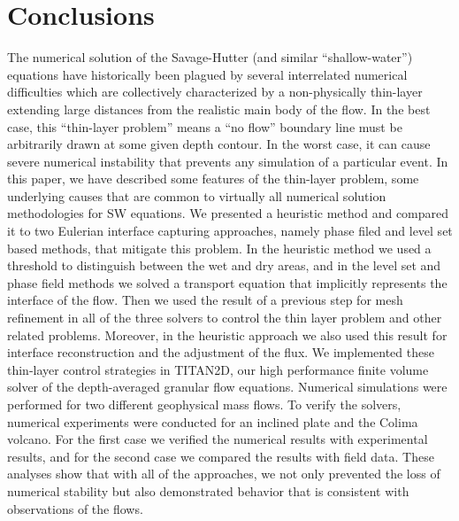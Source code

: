 \documentclass[review]{elsarticle}
\begin{document}
\section{Conclusions} \label{conclusions}
The numerical solution of the Savage-Hutter (and similar 
``shallow-water'') equations have historically been plagued by 
several interrelated numerical difficulties which are collectively characterized by a non-physically thin-layer extending large distances from the realistic main body of the flow. 
In the best case, this ``thin-layer problem'' means a ``no flow'' boundary line must be arbitrarily drawn at some given depth contour.  In 
the worst case, it can cause severe numerical instability that 
prevents any simulation of a particular event.
In this paper, we 
have described some features of the thin-layer problem,
some underlying causes that are common to virtually all numerical 
solution methodologies for SW equations. We presented a heuristic method and compared it to two Eulerian interface capturing approaches, namely phase filed and level set
based methods, that 
mitigate this problem. In the heuristic method we used a threshold to distinguish between the wet and dry areas, and in the level set and phase field methods we solved a 
transport equation that implicitly represents the interface of the flow. Then we used the result of a previous step for mesh refinement in all of the three solvers to control 
the thin layer problem and other related problems. Moreover, in the heuristic approach we also used this result for interface reconstruction and the adjustment of the flux. 
We implemented these thin-layer control strategies in TITAN2D, our high 
performance finite volume solver of the depth-averaged granular 
flow equations. Numerical simulations were performed for two different geophysical mass flows.
To verify the solvers, numerical experiments were conducted for an inclined plate and the Colima volcano. For the first case we verified the numerical results 
with experimental results, and for the second case we compared the results with field data. These analyses show that with all of the approaches,
we not only prevented the loss of numerical stability but also demonstrated behavior that is consistent with observations of the flows.
%
\end{document}
